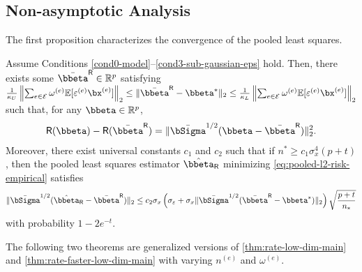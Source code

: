 \documentclass[10pt]{article}
\numberwithin{equation}{section}
\begin{document}
\subsection{Non-asymptotic Analysis}

The first proposition characterizes the convergence of the pooled least squares.


\begin{proposition}
\label{prop:pooled-least-squares}
	Assume Conditions \ref{cond0-model}--\ref{cond3-sub-gaussian-eps} hold. Then, there exists some $\bar{\bbeta}^{\mathsf{R}} \in \mathbb{R}^p$ satisfying $\frac{1}{\kappa_U} \left\|\sum_{e\in \mathcal{E}} \omega^{(e)} \mathbb{E} [\varepsilon^{(e)} \bx^{(e)}] \right\|_2 \le \|\bar{\bbeta}^{\mathsf{R}} - \bbeta^*\|_2 \le \frac{1}{\kappa_L} \left\|\sum_{e\in \mathcal{E}} \omega^{(e)} \mathbb{E} [\varepsilon^{(e)} \bx^{(e)}] \right\|_2$
 	such that, for any $\bbeta \in \mathbb{R}^p$,
	\begin{align}
	\label{eq:pooled-least-square-strong-convexity}
		\mathsf{R}(\bbeta) - \mathsf{R}(\bar{\bbeta}^{\mathsf{R}}) = \|\bar{\bSigma}^{1/2}(\bbeta - \bar{\bbeta}^{\mathsf{R}})\|_2^2.
	\end{align} Moreover, there exist universal constants $c_1$ and $c_2$ such that if $n^* \ge c_1 \sigma_x^4(p + t)$, then the pooled least      squares estimator $\hat{\bbeta}_{\mathsf{R}}$ minimizing \eqref{eq:pooled-l2-risk-empirical} satisfies
	\begin{align}
		\|\bar{\bSigma}^{1/2}(\hat{\bbeta}_{\mathsf{R}} - \bar{\bbeta}^{\mathsf{R}})\|_2 \le c_2 \sigma_x \left(\sigma_\varepsilon + \sigma_x \|\bar{\bSigma}^{1/2}(\bar{\bbeta}^{\mathsf{R}} - \bbeta^*)\|_2\right) \sqrt{\frac{p + t}{n_*}}
	\end{align} with probability $1-2e^{-t}$.
\end{proposition}

The following two theorems are generalized versions of \cref{thm:rate-low-dim-main} and \cref{thm:rate-faster-low-dim-main} with varying $n^{(e)}$ and $\omega^{(e)}$. 
\end{document}
